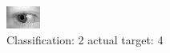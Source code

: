 \begin{figure}[h!]
\begin{center}
\includegraphics[width=0.60\columnwidth]{figures/ID714_class_2_target_4.png}
\end{center}
\caption{ Classification: 2 actual target: 4}
\label{fig:ID714_class_2_target_4}
\end{figure}
